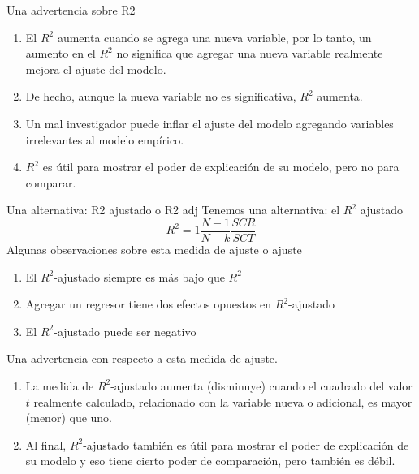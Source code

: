 \begin{frame}{Una advertencia sobre R2}
	\begin{enumerate}
		\item El $R ^ 2$ aumenta cuando se agrega una nueva variable, por lo tanto, un aumento en el $R ^ 2$ no significa que agregar una nueva variable realmente mejora el ajuste del modelo.
		\item De hecho, aunque la nueva variable no es significativa, $R ^ 2$ aumenta.
		\item Un mal investigador puede inflar el ajuste del modelo agregando variables irrelevantes al modelo empírico.
		\item $R ^ 2$ es útil para mostrar el poder de explicación de su modelo, pero no para comparar.
	\end{enumerate}
\end{frame}
\begin{frame}{Una alternativa: R2 ajustado o R2 adj}
	Tenemos una alternativa: el $R^2$ ajustado
		$$R^2 = 1 \frac{N - 1}{N - k} \frac{SCR}{SCT}$$
	Algunas observaciones sobre esta medida de ajuste o ajuste
		\begin{enumerate}
			\item El $R^2$-ajustado siempre es más bajo que $R^2$
			\item Agregar un regresor tiene dos efectos opuestos en $R^2$-ajustado
			\item El $R^2$-ajustado puede ser negativo
		\end{enumerate}
	Una advertencia con respecto a esta medida de ajuste.
		\begin{enumerate}
			\item La medida de $R^2$-ajustado aumenta (disminuye) cuando el cuadrado del valor $t$ realmente calculado, relacionado con la variable nueva o adicional, es mayor (menor) que uno.
			\item Al final, $R^2$-ajustado también es útil para mostrar el poder de explicación de su modelo y eso tiene cierto poder de comparación, pero también es débil.
		\end{enumerate}
\end{frame}